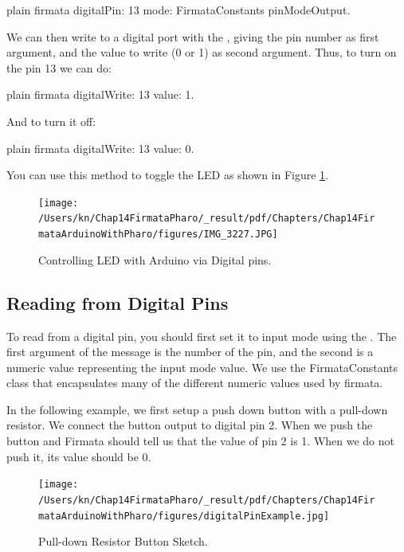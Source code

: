 \documentclass[10pt,twoside,english]{_support/latex/sbabook/sbabook}
\begin{document}
\begin{displaycode}{plain}
  firmata digitalPin: 13 mode: FirmataConstants pinModeOutput.
\end{displaycode}

We can then write to a digital port with the , giving the pin number as first argument, and the value to write (0 or 1) as second argument. Thus, to turn on the pin 13 we can do:

\begin{displaycode}{plain}
  firmata digitalWrite: 13 value: 1.
\end{displaycode}

And to turn it off:

\begin{displaycode}{plain}
  firmata digitalWrite: 13 value: 0.
\end{displaycode}

You can use this method to toggle the LED as shown in Figure \ref{Controlling LED with Arduino via Digital pins}.

\begin{figure}

\begin{center}
\texttt{[image: /Users/kn/Chap14FirmataPharo/\_result/pdf/Chapters/Chap14FirmataArduinoWithPharo/figures/IMG\_3227.JPG]}\caption{Controlling LED with Arduino via Digital pins.\label{Controlling LED with Arduino via Digital pins}}\end{center}
\end{figure}

\subsection{Reading from Digital Pins}
To read from a digital pin, you should first set it to input mode using the . 
The first argument of the message is the number of the pin, and the second is a numeric value representing the input mode value. 
We use the FirmataConstants class that encapsulates many of the different numeric values used by firmata.

In the following example, we first setup a push down button with a pull-down resistor.
We connect the button output to digital pin 2.
When we push the button and Firmata should tell us that the value of pin 2 is 1. When we do not push it, its value should be 0.


\begin{figure}

\begin{center}
\texttt{[image: /Users/kn/Chap14FirmataPharo/\_result/pdf/Chapters/Chap14FirmataArduinoWithPharo/figures/digitalPinExample.jpg]}\caption{Pull-down Resistor Button Sketch.\label{Pull-down Resistor Button Sketch}}\end{center}
\end{figure}
\end{document}
